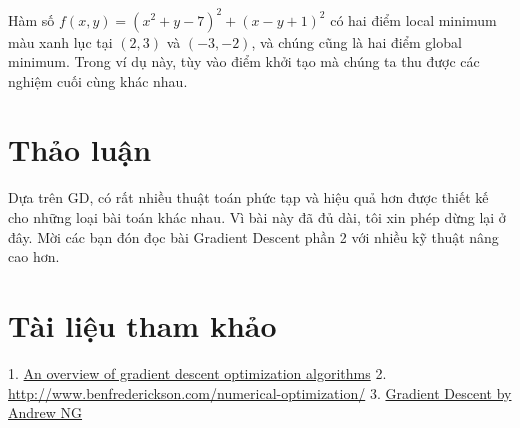 Hàm số $f(x, y) = (x^2 + y - 7)^2 + (x - y + 1)^2$ có hai điểm local minimum màu xanh lục tại $(2, 3)$ và $(-3, -2)$, và chúng cũng là hai điểm global minimum. Trong ví dụ này, tùy vào điểm khởi tạo mà chúng ta thu được các nghiệm cuối cùng khác nhau. 
 
 
\section{Thảo luận}
 
Dựa trên GD, có rất nhiều thuật toán phức tạp và hiệu quả hơn được thiết kế cho những loại bài toán khác nhau. Vì bài này đã đủ dài, tôi xin phép dừng lại ở đây. Mời các bạn đón đọc bài Gradient Descent phần 2 với nhiều kỹ thuật nâng cao hơn. 
 
 
\section{Tài liệu tham khảo}
1. \href{http://sebastianruder.com/optimizing-gradient-descent/}{An overview of gradient descent optimization algorithms} 
2. \href{http://machinelearningcoban.comAn Interactive Tutorial on Numerical Optimization}{http://www.benfrederickson.com/numerical-optimization/} 
3. \href{https://www.youtube.com/watch?v=eikJboPQDT0}{Gradient Descent by Andrew NG} 

